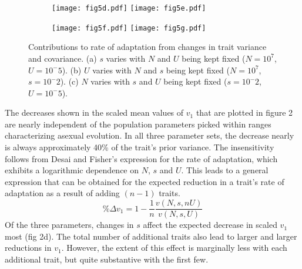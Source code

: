 \documentclass[11pt,twocolumn]{article}
\begin{document}
\begin{figure}[h]
\begin{subfigure}[b]{1\linewidth}
\centering
\texttt{[image: fig5d.pdf]}
\texttt{[image: fig5e.pdf]}
\end{subfigure}
\begin{subfigure}[b]{1\linewidth}
\centering
\texttt{[image: fig5f.pdf]}
\texttt{[image: fig5g.pdf]}
\end{subfigure}
\label{fig}
\caption{\footnotesize Contributions to rate of adaptation from changes in trait variance and covariance. (a) $s$ varies with $N$ and $U$ being kept fixed ($N= 10^7$, $U=10^-5$). (b) $U$ varies with $N$ and $s$ being kept fixed ($N= 10^7$,$s=10^-2$). (c) $N$ varies with $s$ and $U$ being kept fixed ($s=10^-2$,$U=10^-5$).}
\end{figure}

The decreases shown in the scaled mean values of $v_1$ that are plotted in figure 2 are nearly independent of the population parameters picked within ranges characterizing asexual evolution. In all three parameter sets, the decrease nearly is always approximately 40\% of the trait's prior variance. The insensitivity follows from Desai and Fisher's expression for the rate of adaptation, which exhibits a logarithmic dependence on $N$, $s$ and $U$. This leads to a general expression that can be obtained for the expected reduction in a trait's rate of adaptation as a result of adding  $(n-1)$ traits.
\[
\% \Delta v_1 
= 1-\frac{1}{n}\frac{v(N,s,nU)}{v(N,s,U)}
\]
Of the three parameters, changes in $s$ affect the expected decrease in scaled $v_1$ most (fig 2d). The total number of additional traits also lead to larger and larger reductions in $v_1$. However, the extent of this effect is marginally less with each additional trait, but quite substantive with the first few. \par
\end{document}
